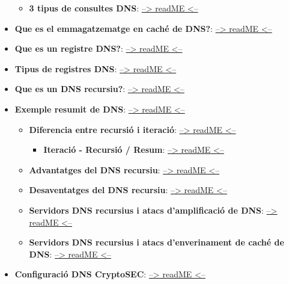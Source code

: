 \documentclass[]{article}
\providecommand{\tightlist}{%
  \setlength{\itemsep}{0pt}\setlength{\parskip}{0pt}}
\begin{document}
\begin{itemize}
  \begin{itemize}
  \tightlist
  \item
    \textbf{3 tipus de consultes DNS}:
    \protect\hyperlink{3-tipus-de-consultes-dns}{--\textgreater{} readME
    \textless{}--}
  \end{itemize}
\item
  \textbf{Que es el emmagatzematge en caché de DNS?}:
  \protect\hyperlink{que-es-el-emmagatzematge-en-cachuxe9-de-dns}{--\textgreater{}
  readME \textless{}--}
\item
  \textbf{Que es un registre DNS?}:
  \protect\hyperlink{que-es-un-registre-dns}{--\textgreater{} readME
  \textless{}--}
\item
  \textbf{Tipus de registres DNS}:
  \protect\hyperlink{tipus-de-registres-dns}{--\textgreater{} readME
  \textless{}--}
\item
  \textbf{Que es un DNS recursiu?}:
  \protect\hyperlink{que-es-un-dns-recursiu}{--\textgreater{} readME
  \textless{}--}
\item
  \textbf{Exemple resumit de DNS}:
  \protect\hyperlink{exemple-resumit-de-dns}{--\textgreater{} readME
  \textless{}--}

  \begin{itemize}
  \item
    \textbf{Diferencia entre recursió i iteració}:
    \protect\hyperlink{diferencia-entre-recursiuxf3-i-iteraciuxf3}{--\textgreater{}
    readME \textless{}--}

    \begin{itemize}
    \tightlist
    \item
      \textbf{Iteració - Recursió / Resum}:
      \protect\hyperlink{iteraciuxf3---recursiuxf3--resum}{--\textgreater{}
      readME \textless{}--}
    \end{itemize}
  \item
    \textbf{Advantatges del DNS recursiu}:
    \protect\hyperlink{advantatges-del-dns-recursiu}{--\textgreater{}
    readME \textless{}--}
  \item
    \textbf{Desaventatges del DNS recursiu}:
    \protect\hyperlink{desaventatges-del-dns-recursiu}{--\textgreater{}
    readME \textless{}--}
  \item
    \textbf{Servidors DNS recursius i atacs d'amplificació de DNS}:
    \protect\hyperlink{servidors-dns-recursius-i-atacs-damplificaciuxf3-de-dns}{--\textgreater{}
    readME \textless{}--}
  \item
    \textbf{Servidors DNS recursius i atacs d'enverinament de caché de
    DNS}:
    \protect\hyperlink{servidors-dns-recursius-i-atacs-denvergament-de-cachuxe9-de-dns}{--\textgreater{}
    readME \textless{}--}
  \end{itemize}
\item
  \textbf{Configuració DNS CryptoSEC}:
  \protect\hyperlink{configuraciuxf3-dns-cryptosec}{--\textgreater{}
  readME \textless{}--}


\end{itemize}
\end{document}
